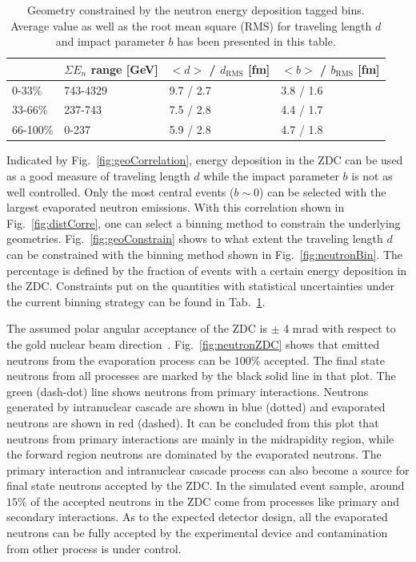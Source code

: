\begin{table}[width=0.85\columnwidth]
\centering
\begin{tabular}{ |l || l | l | l | } \hline 
		& $\Sigma E_{n}$ range [GeV] & $<d>$ / $d_{\mathrm{RMS}}$ [fm] & $<b>$ / $b_{\mathrm{RMS}}$ [fm] 	\\ \hline
0-33\%	& 743-4329		&	9.7 / 2.7	& 3.8 / 1.6	 \\ \hline
33-66\%	& 237-743		&	7.5 / 2.8	& 4.4 / 1.7	\\ \hline
66-100\%& 0-237			&	5.9 / 2.8	& 4.7 / 1.8	\\ \hline
\end{tabular}
\caption[Constrained geometric quantity with the neutron binning method]{Geometry constrained by the neutron energy deposition tagged bins. Average value as well as the root mean square (RMS) for traveling length $d$ and impact parameter $b$ has been presented in this table.}
\label{tab:geoConstr}
\end{table}


Indicated by Fig.~\ref{fig:geoCorrelation}, energy deposition in the ZDC can be used
as a good measure of traveling length $d$ while the impact parameter $b$ is not as
well controlled. 
Only the most central events ($b\sim0$) can be selected with the largest
evaporated neutron emissions. With this correlation shown in
Fig.~\ref{fig:distCorre}, one can select a binning method to constrain the
underlying geometries. Fig.~\ref{fig:geoConstrain} shows to what extent the
traveling length $d$ can be constrained with the binning method shown in
Fig.~\ref{fig:neutronBin}. The percentage is defined by the fraction of events with
a certain energy deposition in the ZDC.
Constraints put on the quantities with statistical uncertainties under the
current binning strategy can be found in Tab.~\ref{tab:geoConstr}.


The assumed polar angular acceptance of the ZDC is $\pm$ 4 mrad with respect to
the gold nuclear beam direction~\cite{Accardi:2012qut}.
Fig.~\ref{fig:neutronZDC} shows that emitted neutrons from the evaporation
process can be $100\%$ accepted. The final state neutrons from all processes are
marked by the black solid line in that plot. The green (dash-dot) line shows neutrons from
primary interactions. Neutrons generated by intranuclear cascade are shown in
blue (dotted) and evaporated neutrons are shown in red (dashed). It can be concluded from this
plot that neutrons from primary interactions are mainly in the midrapidity
region, while the forward region neutrons are dominated by the evaporated
neutrons. The primary interaction and intranuclear cascade process can also
become a source for final state neutrons accepted by the ZDC. In the simulated
event sample, around $15\%$ of the accepted neutrons in the ZDC come from processes
like primary and secondary interactions. As to the expected detector design, all
the evaporated neutrons can be fully accepted by the experimental device and
contamination from other process is under control.

